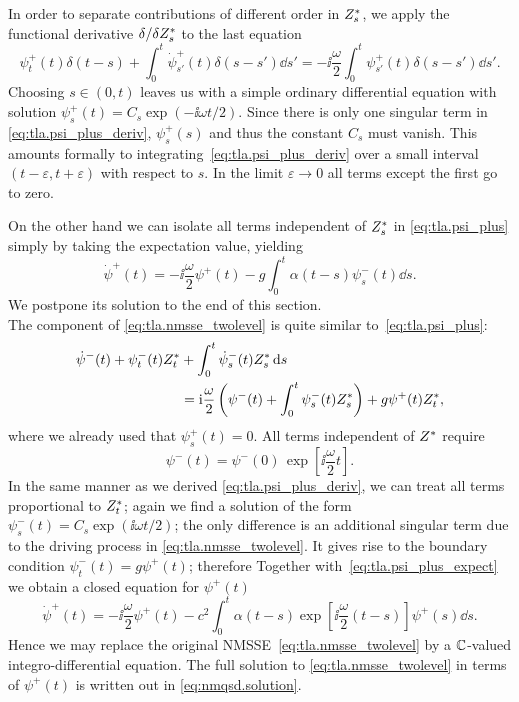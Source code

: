 In order to separate contributions of different order in ${Z}^*_s$, we apply the functional derivative $\delta/\delta{Z}^*_s$ to the last equation
\begin{equation}
  \psi^+_t(t) \delta(t - s) + \int_0^t \dot\psi^+_{s'}(t) \delta(s - s') \dd s' = -\ii \frac{\omega}{2} \int_0^t \psi^+_{s'}(t) \delta(s - s') \dd s'.
  \label{eq:tla.psi_plus_deriv}
\end{equation}
Choosing $s \in (0, t)$ leaves us with a simple ordinary differential equation with solution $\psi^+_s(t) = C_s \exp(- \ii \omega t / 2)$.
Since there is only one singular term in \autoref{eq:tla.psi_plus_deriv}, $\psi^+_s(s)$ and thus the constant $C_s$ must vanish.
This amounts formally to integrating~\ref{eq:tla.psi_plus_deriv} over a small interval $(t-\varepsilon, t+\varepsilon)$ with respect to $s$.
In the limit $\varepsilon \to 0$ all terms except the first go to zero.

On the other hand we can isolate all terms independent of ${Z}^*_s$ in \autoref{eq:tla.psi_plus} simply by taking the expectation value, yielding
\begin{equation}
  \dot\psi^+(t) = -\ii \frac{\omega}{2} \psi^+(t)  - g \int_0^t \alpha(t - s) \psi^-_s(t) \dd s.
  \label{eq:psi_plus_expect}
\end{equation}
We postpone its solution to the end of this section.\\



The \quotes{-} component of \autoref{eq:tla.nmsse_twolevel} is quite similar to~\ref{eq:tla.psi_plus}:
\begin{align}
  \dot\psi^-(t) + \psi^-_t(t){Z}^*_t &+ \int_0^t \dot\psi^-_s(t){Z}^*_s \, \mathrm{d} s \nonumber \\
  &= \mathrm{i} \frac{\omega}{2} \left( \psi^-(t) + \int_0^t \psi^-_s(t){Z}^*_s \right) + g \psi^+(t){Z}^*_t,
  \label{eq:tla.psi_minus}
\end{align}
where we already used that $\psi^+_s(t) = 0$.
All terms independent of ${Z}^*$ require
\begin{equation}
  \psi^-(t) = \psi^-(0) \, \exp[\ii \frac{\omega}{2} t].
\end{equation}
In the same manner as we derived \autoref{eq:tla.psi_plus_deriv}, we can treat all terms proportional to ${Z}^*_t$;
again we find a solution of the form $\psi^-_s(t) = C_s \exp(\ii\omega t / 2)$; the only difference is an additional singular term due to the driving process in \autoref{eq:tla.nmsse_twolevel}.
It gives rise to the boundary condition $\psi^-_t(t) = g \psi^+(t)$; therefore
Together with~\ref{eq:tla.psi_plus_expect} we obtain a closed equation for $\psi^+(t)$
\begin{equation}
  \dot\psi^+(t) = -\ii \frac{\omega}{2} \psi^+(t) - c^2 \int_0^t \alpha(t - s) \exp[\ii \frac{\omega}{2} (t - s)] \psi^+(s) \dd s.
  \label{eq:tla.psi_plus_eq}
\end{equation}
Hence we may replace the original NMSSE~\ref{eq:tla.nmsse_twolevel} by a $\mathbb{C}$-valued integro-differential equation.
The full solution to \autoref{eq:tla.nmsse_twolevel} in terms of $\psi^+(t)$ is written out in \autoref{eq:nmqsd.solution}.


